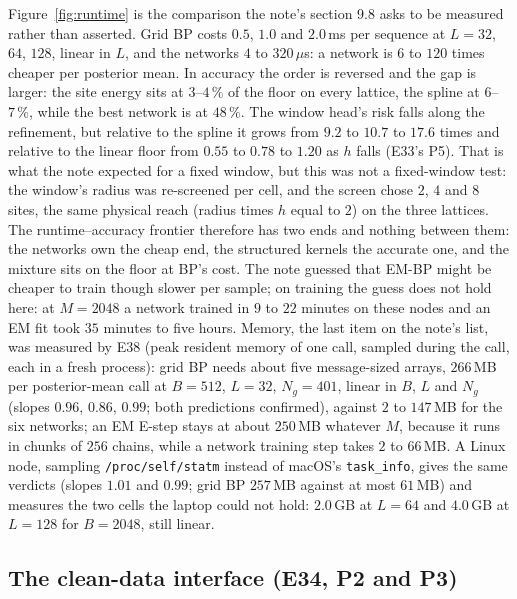 \documentclass[10pt,a4paper]{article}
\newcommand{\Nn}{\mathcal{N}}
\theoremstyle{plain}
\theoremstyle{remark}
\begin{document}
Figure~\ref{fig:runtime} is the comparison the note's section 9.8 asks to be measured rather than asserted. Grid BP
costs $0.5$, $1.0$ and $2.0$\,ms per sequence at $L=32$, $64$, $128$, linear in $L$, and the networks $4$ to $320\,\mu$s:
a network is $6$ to $120$ times cheaper per posterior mean. In accuracy the order is reversed and the gap is larger:
the site energy sits at $3$--$4\,\%$ of the floor on every lattice, the spline at $6$--$7\,\%$, while the best network
is at $48\,\%$. The window head's risk falls along the refinement, but relative to the spline it grows from $9.2$ to $10.7$
to $17.6$ times and relative to the linear floor from $0.55$ to $0.78$ to $1.20$ as $h$ falls (E33's P5). That is what the
note expected for a fixed window, but this was not a fixed-window test: the window's radius was re-screened per cell,
and the screen chose $2$, $4$ and $8$ sites, the same physical reach (radius times $h$ equal to $2$) on the three lattices. The
runtime--accuracy frontier therefore has two ends and nothing between them: the networks own the cheap end, the
structured kernels the accurate one, and the mixture sits on the floor at BP's cost. The note guessed that EM-BP
might be cheaper to train though slower per sample; on training the guess does not hold here: at $M=2048$ a network
trained in $9$ to $22$ minutes on these nodes and an EM fit took $35$ minutes to five hours. Memory, the last item on the
note's list, was measured by E38 (peak resident memory of one call, sampled during the call, each in a fresh
process): grid BP needs about five message-sized arrays, $266$\,MB per posterior-mean call at $B=512$, $L=32$,
$N_g=401$, linear in $B$, $L$ and $N_g$ (slopes $0.96$, $0.86$, $0.99$; both predictions confirmed), against
$2$ to $147$\,MB for the six networks; an EM E-step stays at about $250$\,MB whatever $M$, because it runs in
chunks of $256$ chains, while a network training step takes $2$ to $66$\,MB. A Linux node, sampling
\texttt{/proc/self/statm} instead of macOS's \texttt{task\_info}, gives the same verdicts (slopes $1.01$ and $0.99$; grid BP
$257$\,MB against at most $61$\,MB) and measures the two cells the laptop could not hold: $2.0$\,GB at $L=64$ and $4.0$\,GB at
$L=128$ for $B=2048$, still linear.

\subsection{The clean-data interface (E34, P2 and P3)}\label{sec:conf-clean}

\begin{table}[h]\centering\footnotesize
\caption{E34's clean-data fits at $M=2048$, sixteen seeds. ``parked'': fits whose first-site law has more
than half its mass beyond $|a|=3.5$ (amendment~2); ``eig.'': fits whose invariant law the eigensolve could
not return (the estimator then used $\Nn(0,1)$).}
\label{tab:conf-clean}

\end{table}
\end{document}
